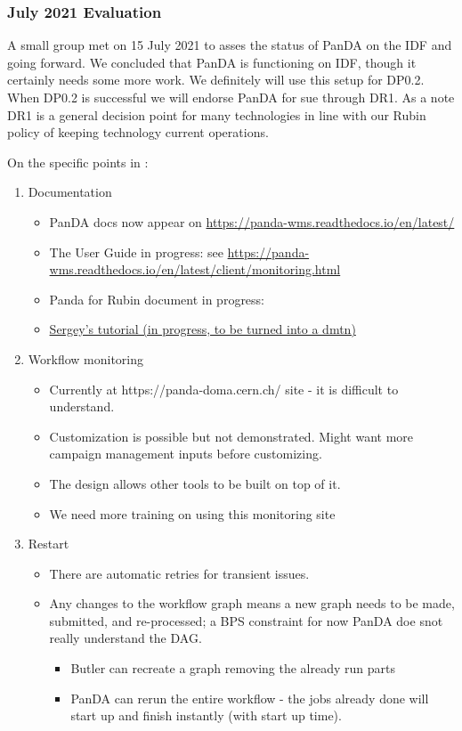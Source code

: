 \subsubsection{July 2021 Evaluation}
A small group met on 15 July 2021 to asses the status of PanDA on the IDF and going forward.
We  concluded  that PanDA is functioning on IDF, though it certainly needs some more work.
We definitely will use this setup for DP0.2.
When DP0.2 is  successful we will endorse PanDA for sue  through DR1.
As a note DR1 is a general decision point for many technologies in line with our Rubin policy of keeping technology current operations.

On the specific points in :
\begin{enumerate}
\item Documentation
\begin{itemize}
\item PanDA docs now appear on \url{https://panda-wms.readthedocs.io/en/latest/}
\item The User Guide in progress:  see \url{https://panda-wms.readthedocs.io/en/latest/client/monitoring.html}
\item Panda for Rubin document in progress: 
\item \href{https://docs.google.com/document/d/1J0Dxe_TJoIpWQm_izBY4Cz6mWkgLCVTZB6pZxkjS0Gg/edit}{ Sergey’s tutorial (in progress, to be turned into a dmtn) }
\end{itemize}
\item Workflow monitoring
\begin{itemize}
\item Currently at https://panda-doma.cern.ch/ site - it is difficult to understand.
\item Customization is possible but not demonstrated. Might want more campaign management inputs before customizing.
\item The design allows other tools to be built on top of it.
\item We need more training on using this monitoring site
\end{itemize}
\item Restart
\begin{itemize}
\item  There are automatic retries for transient issues.
\item Any changes to the workflow graph means a new graph needs to be made, submitted, and re-processed;  a BPS constraint for now PanDA doe snot really understand the DAG.
\begin{itemize}
\item Butler can recreate a graph removing the already run parts
\item PanDA can rerun the entire workflow - the jobs already done will start up and finish instantly (with start up time).
\end{itemize}


\end{itemize}
\end{enumerate}
